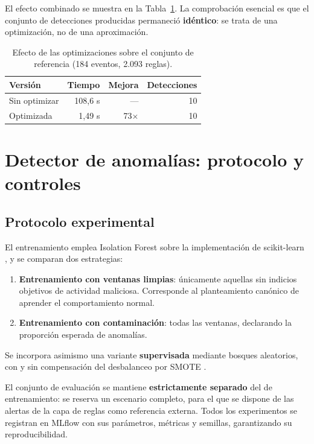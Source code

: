 El efecto combinado se muestra en la Tabla~\ref{tab:optimizacion}. La comprobación esencial
es que el conjunto de detecciones producidas permaneció \textbf{idéntico}: se trata de una
optimización, no de una aproximación.

\begin{table}[H]
\centering
\begin{tabular}{|l|r|r|r|}
\hline
\textbf{Versión} & \textbf{Tiempo} & \textbf{Mejora} & \textbf{Detecciones} \\
\hline
Sin optimizar & 108{,}6 s & --- & 10 \\
Optimizada    & 1{,}49 s & 73$\times$ & 10 \\
\hline
\end{tabular}
\caption{Efecto de las optimizaciones sobre el conjunto de referencia (184 eventos, 2.093 reglas).}
\label{tab:optimizacion}
\end{table}


\section{Detector de anomalías: protocolo y controles}
\label{anx:anomalias}

\subsection{Protocolo experimental}

El entrenamiento emplea Isolation Forest \cite{isolationforest} sobre la implementación de
scikit-learn \cite{scikitlearn}, y se comparan dos estrategias:

\begin{enumerate}
    \item \textbf{Entrenamiento con ventanas limpias}: únicamente aquellas sin indicios
    objetivos de actividad maliciosa. Corresponde al planteamiento canónico de aprender el
    comportamiento normal.
    \item \textbf{Entrenamiento con contaminación}: todas las ventanas, declarando la
    proporción esperada de anomalías.
\end{enumerate}

Se incorpora asimismo una variante \textbf{supervisada} mediante bosques aleatorios, con y sin
compensación del desbalanceo por SMOTE \cite{smote}.

El conjunto de evaluación se mantiene \textbf{estrictamente separado} del de entrenamiento: se
reserva un escenario completo, para el que se dispone de las alertas de la capa de reglas como
referencia externa. Todos los experimentos se registran en MLflow \cite{mlflow} con sus
parámetros, métricas y semillas, garantizando su reproducibilidad.


